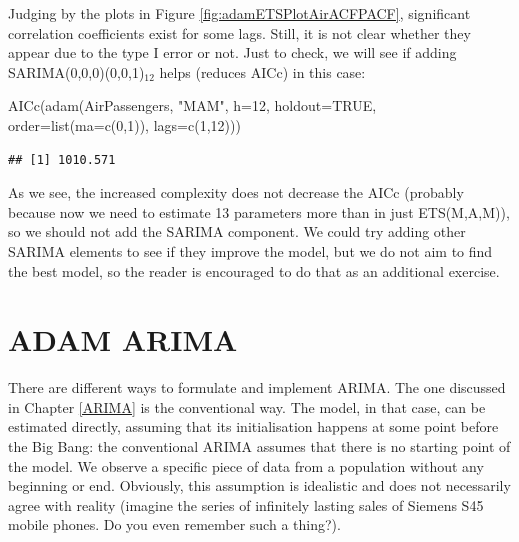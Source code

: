 \documentclass[
]{book}
\newenvironment{Shaded}{\begin{snugshade}}{\end{snugshade}}
\newcommand{\AttributeTok}[1]{\textcolor[rgb]{0.77,0.63,0.00}{#1}}
\newcommand{\ConstantTok}[1]{\textcolor[rgb]{0.00,0.00,0.00}{#1}}
\newcommand{\DecValTok}[1]{\textcolor[rgb]{0.00,0.00,0.81}{#1}}
\newcommand{\FunctionTok}[1]{\textcolor[rgb]{0.00,0.00,0.00}{#1}}
\newcommand{\NormalTok}[1]{#1}
\newcommand{\StringTok}[1]{\textcolor[rgb]{0.31,0.60,0.02}{#1}}
\theoremstyle{definition}
\theoremstyle{definition}
\theoremstyle{definition}
\theoremstyle{definition}
\theoremstyle{remark}
\begin{document}
Judging by the plots in Figure \ref{fig:adamETSPlotAirACFPACF}, significant correlation coefficients exist for some lags. Still, it is not clear whether they appear due to the type I error or not. Just to check, we will see if adding SARIMA(0,0,0)(0,0,1)\(_{12}\) helps (reduces AICc) in this case:

\begin{Shaded}
\begin{Highlighting}[]
\FunctionTok{AICc}\NormalTok{(}\FunctionTok{adam}\NormalTok{(AirPassengers, }\StringTok{"MAM"}\NormalTok{, }\AttributeTok{h=}\DecValTok{12}\NormalTok{, }\AttributeTok{holdout=}\ConstantTok{TRUE}\NormalTok{,}
          \AttributeTok{order=}\FunctionTok{list}\NormalTok{(}\AttributeTok{ma=}\FunctionTok{c}\NormalTok{(}\DecValTok{0}\NormalTok{,}\DecValTok{1}\NormalTok{)), }\AttributeTok{lags=}\FunctionTok{c}\NormalTok{(}\DecValTok{1}\NormalTok{,}\DecValTok{12}\NormalTok{)))}
\end{Highlighting}
\end{Shaded}

\begin{verbatim}
## [1] 1010.571
\end{verbatim}

As we see, the increased complexity does not decrease the AICc (probably because now we need to estimate 13 parameters more than in just ETS(M,A,M)), so we should not add the SARIMA component. We could try adding other SARIMA elements to see if they improve the model, but we do not aim to find the best model, so the reader is encouraged to do that as an additional exercise.

\hypertarget{ADAMARIMA}{%
\chapter{ADAM ARIMA}\label{ADAMARIMA}}

There are different ways to formulate and implement ARIMA. The one discussed in Chapter \ref{ARIMA} is the conventional way. The model, in that case, can be estimated directly, assuming that its initialisation happens at some point before the Big Bang: the conventional ARIMA assumes that there is no starting point of the model. We observe a specific piece of data from a population without any beginning or end. Obviously, this assumption is idealistic and does not necessarily agree with reality (imagine the series of infinitely lasting sales of Siemens S45 mobile phones. Do you even remember such a thing?).
\end{document}
